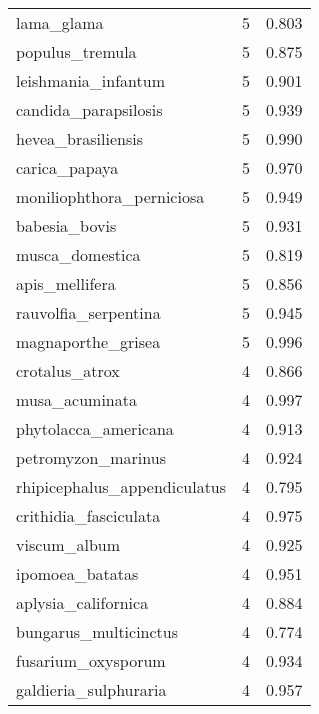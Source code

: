 \begin{tabular}{lrr}
                     lama\_glama &                   5 &     0.803 \\
                populus\_tremula &                   5 &     0.875 \\
            leishmania\_infantum &                   5 &     0.901 \\
           candida\_parapsilosis &                   5 &     0.939 \\
             hevea\_brasiliensis &                   5 &     0.990 \\
                  carica\_papaya &                   5 &     0.970 \\
      moniliophthora\_perniciosa &                   5 &     0.949 \\
                  babesia\_bovis &                   5 &     0.931 \\
                musca\_domestica &                   5 &     0.819 \\
                 apis\_mellifera &                   5 &     0.856 \\
           rauvolfia\_serpentina &                   5 &     0.945 \\
             magnaporthe\_grisea &                   5 &     0.996 \\
                 crotalus\_atrox &                   4 &     0.866 \\
                 musa\_acuminata &                   4 &     0.997 \\
           phytolacca\_americana &                   4 &     0.913 \\
             petromyzon\_marinus &                   4 &     0.924 \\
   rhipicephalus\_appendiculatus &                   4 &     0.795 \\
          crithidia\_fasciculata &                   4 &     0.975 \\
                   viscum\_album &                   4 &     0.925 \\
                ipomoea\_batatas &                   4 &     0.951 \\
            aplysia\_californica &                   4 &     0.884 \\
          bungarus\_multicinctus &                   4 &     0.774 \\
             fusarium\_oxysporum &                   4 &     0.934 \\
          galdieria\_sulphuraria &                   4 &     0.957 \\

\end{tabular}
